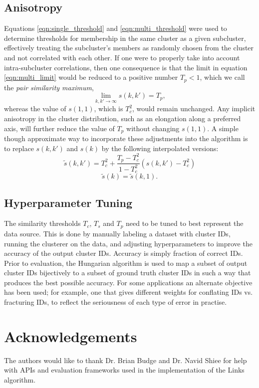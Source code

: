 \documentclass{article}
\begin{document}
\subsection{Anisotropy}
\label{sec:anisotropy}

Equations \ref{eqn:single_threshold} and \ref{eqn:multi_threshold} were used to determine thresholds for membership in the same cluster as a given subcluster, effectively treating the subcluster's members as randomly chosen from the cluster and not correlated with each other. If one were to properly take into account intra-subcluster correlations, then one consequence is that the limit in equation \ref{eqn:multi_limit} would be reduced to a positive number $T_p<1$, which we call the \textit{pair similarity maximum},
\begin{equation}\label{eqn:anisotropic_limit}
\lim_{k,k'\rightarrow\infty}s(k,k')=T_p,
\end{equation}
whereas the value of $s(1,1)$, which is $T_c^2$, would remain unchanged. Any implicit anisotropy in the cluster distribution, such as an elongation along a preferred axis, will further reduce the value of $T_p$ without changing $s(1,1)$. A simple though approximate way to incorporate these adjustments into the algorithm is to replace $s(k,k')$ and $s(k)$ by the following interpolated versions:
\begin{equation}\label{eqn:anisotropic_multi}
\tilde{s}(k,k')=T_c^2+\frac{T_p-T_c^2}{1-T_c^2}\left(s(k,k')-T_c^2\right)
\end{equation}
\begin{equation}\label{eqn:anisotropic_single}
\tilde{s}(k)=\tilde{s}(k,1).
\end{equation}

\subsection{Hyperparameter Tuning}
\label{sec:hyperparameter}

The similarity thresholds $T_c$, $T_s$ and $T_p$ need to be tuned to best represent the data source. This is done by manually labeling a dataset with cluster IDs, running the clusterer on the data, and adjusting hyperparameters to improve the accuracy of the output cluster IDs. Accuracy is simply fraction of correct IDs. Prior to evaluation, the Hungarian algorithm \cite{kuhn1955hungarian} is used to map a subset of output cluster IDs bijectively to a subset of ground truth cluster IDs in such a way that produces the best possible accuracy. For some applications an alternate objective has been used; for example, one that gives different weights for conflating IDs vs. fracturing IDs, to reflect the seriousness of each type of error in practise.

\section{Acknowledgements}
\label{sec:ack}

The authors would like to thank Dr. Brian Budge and Dr. Navid Shiee for help with APIs and evaluation frameworks used in the implementation of the Links algorithm.

\newpage


\end{document}
